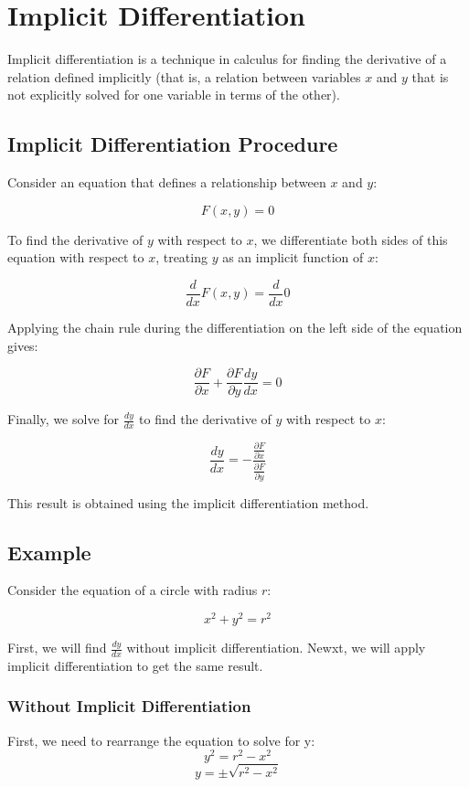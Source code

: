 \chapter{Implicit Differentiation}

Implicit differentiation is a technique in calculus for finding the
derivative of a relation defined implicitly (that is, a relation
between variables $x$ and $y$ that is not explicitly solved for one
variable in terms of the other).

\section{Implicit Differentiation Procedure}

Consider an equation that defines a relationship between $x$ and $y$:

\[
F(x, y) = 0
\]

To find the derivative of $y$ with respect to $x$, we differentiate
both sides of this equation with respect to $x$, treating $y$ as an
implicit function of $x$:

$$\frac{d}{dx} F(x, y) = \frac{d}{dx} 0$$

Applying the chain rule during the differentiation on the left side of
the equation gives:

$$\frac{\partial F}{\partial x} + \frac{\partial F}{\partial y} 
\frac{dy}{dx} = 0$$

Finally, we solve for $\frac{dy}{dx}$ to find the derivative of $y$
with respect to $x$:

$$\frac{dy}{dx} = 
-\frac{\frac{\partial F}{\partial x}}{\frac{\partial F}{\partial y}}$$

This result is obtained using the implicit differentiation method.

\section{Example}

Consider the equation of a circle with radius $r$:

$$x^2 + y^2 = r^2$$

First, we will find $\frac{dy}{dx}$ without implicit 
differentiation. Newxt, we will apply implicit differentiation to get 
the same result. 

\subsection{Without Implicit Differentiation}
First, we need to rearrange the equation to solve for y: $$y^2 = r^2 
- x^2$$
$$y = \pm \sqrt{r^2 - x^2}$$

